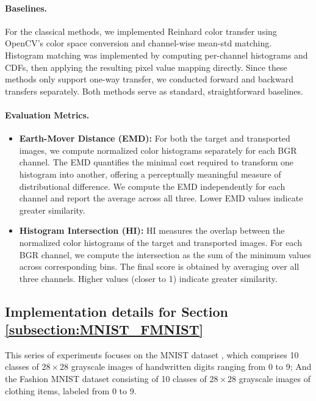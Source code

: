 \documentclass{article} %
\theoremstyle{plain}
\theoremstyle{definition}
\theoremstyle{remark}
\begin{document}
\paragraph{Baselines.} 
For the classical methods, we implemented Reinhard color transfer using OpenCV’s \cite{bradski2008learning} color space conversion and channel-wise mean-std matching. Histogram matching was implemented by computing per-channel histograms and CDFs, then applying the resulting pixel value mapping directly. 
Since these methods only support one-way transfer, we conducted forward and backward transfers separately. Both methods serve as standard, straightforward baselines.

\paragraph{Evaluation Metrics.}
\begin{itemize}
\item \textbf{Earth-Mover Distance (EMD):} For both the target and transported images, we compute normalized color histograms separately for each BGR channel. The EMD quantifies the minimal cost required to transform one histogram into another, offering a perceptually meaningful measure of distributional difference. We compute the EMD independently for each channel and report the average across all three. Lower EMD values indicate greater similarity.

\item  \textbf{Histogram Intersection (HI):}  HI measures the overlap between the normalized color histograms of the target and transported images. For each BGR channel, we compute the intersection as the sum of the minimum values across corresponding bins. The final score is obtained by averaging over all three channels. Higher values (closer to 1) indicate greater similarity.
\end{itemize}


\subsection{Implementation details for Section \ref{subsection:MNIST_FMNIST}}\label{append:details_of_MNIST_FMNIST}
This series of experiments focuses on the MNIST dataset \citep{lecun1998mnist}, which comprises 10 classes of $28 \times 28$ grayscale images of handwritten digits ranging from 0 to 9; And the Fashion MNIST dataset consisting of 10 classes of $28 \times 28$ grayscale images of clothing items, labeled from 0 to 9.
\end{document}
